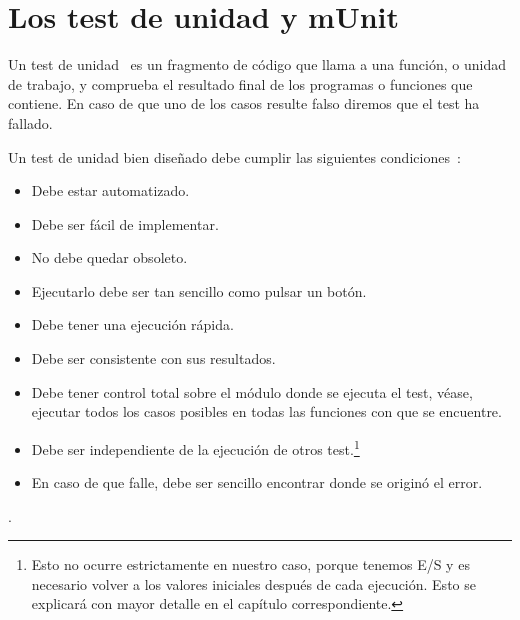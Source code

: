

\section{Los test de unidad y mUnit}

Un test de unidad~\cite{unitTests} es un fragmento de código que llama a una función, o unidad de trabajo, y comprueba el resultado final de los programas o funciones que contiene. En caso de que uno de los casos resulte falso diremos que el test ha fallado.\par

Un test de unidad bien diseñado debe cumplir las siguientes condiciones~\cite{unitTests}: \par

\begin{itemize}
\item Debe estar automatizado.
\item Debe ser fácil de implementar.
\item No debe quedar obsoleto.
\item Ejecutarlo debe ser tan sencillo como pulsar un botón.
\item Debe tener una ejecución rápida.
\item Debe ser consistente con sus resultados. 
\item Debe tener control total sobre el módulo donde se ejecuta el test, véase, ejecutar todos los casos posibles en todas las funciones con que se encuentre.
\item Debe ser independiente de la ejecución de otros test.\footnote{Esto no ocurre estrictamente en nuestro caso, porque tenemos E/S y es necesario volver a los valores iniciales después de cada ejecución. Esto se explicará con mayor detalle en el capítulo correspondiente.}
\item En caso de que falle, debe ser sencillo encontrar donde se originó el error.
\end{itemize}.

